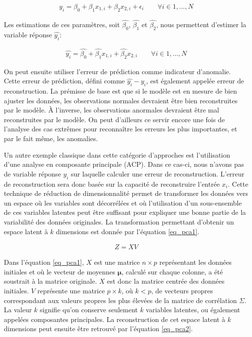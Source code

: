 \begin{gather}  \label{eq_reg}
y_i = \beta_0 + \beta_{1} x_{1,i} + \beta_2 x_{2,i} + \epsilon_{i} \qquad \forall i \in {1,...,N}
\end{gather}

Les estimations de ces paramètres, soit $\hat{\beta_0}$, $\hat{\beta_1}$ et $\hat{\beta_2}$, nous permettent d'estimer la variable réponse $\hat{y_i}$: 

\begin{gather}  \label{eq_reghat}
\hat{y_i} = \hat{\beta_0} + \hat{\beta_{1}} x_{1,i} + \hat{\beta_2} x_{2,i} \qquad \forall i \in {1,...,N}
\end{gather}

On peut ensuite utiliser l'erreur de prédiction comme indicateur d'anomalie. Cette erreur de prédiction, défini comme $\hat{y_i} - y_i$, est également appelée erreur de reconstruction. La prémisse de base est que si le modèle est en mesure de bien ajuster les données, les observations normales devraient être bien reconstruites par le modèle. À l'inverse, les observations anormales devraient être mal reconstruites par le modèle.  On peut d'ailleurs ce servir encore une fois de l'analyse des cas extrêmes pour reconnaître les erreurs les plus importantes, et par le fait même, les anomalies.
 
Un autre exemple classique dans cette catégorie d'approches est l'utilisation d'une analyse en composante principale (ACP). Dans ce cas-ci, nous n'avons pas de variable réponse $y_i$ sur laquelle calculer une erreur de reconstruction. L'erreur de reconstruction sera donc basée sur la capacité de reconstruire l'entrée $x_i$. Cette technique de réduction de dimensionnalité permet de transformer les données vers un espace où les variables sont décorrélées et où l'utilisation d'un sous-ensemble de ces variables latentes peut être suffisant pour expliquer une bonne partie de la variabilité des données originales. La transformation permettant d'obtenir un espace latent à $k$ dimensions est donnée par l'équation \ref{eq_pca1}.
 
 \begin{gather}  \label{eq_pca1}
 Z = XV
 \end{gather}
 
Dans l'équation \ref{eq_pca1}, $X$ est une matrice $n \times p$ représentant les données initiales et où le vecteur de moyennes $\boldsymbol{\mu}$, calculé sur chaque colonne, a été soustrait à la matrice originale. $X$ est donc la matrice centrée des données initiales. $V$ représente une matrice $p \times k$, où $k < p$, de  vecteurs propres correspondant aux valeurs propres les plus élevées de la matrice de corrélation $\Sigma$. La valeur $k$ signifie qu'on conserve seulement $k$ variables latentes, ou également appelées composantes principales. La reconstruction de cet espace latent à $k$ dimensions peut ensuite être retrouvé par l'équation \ref{eq_pca2}. 
 
